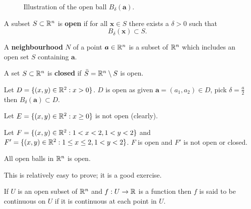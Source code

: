 \begin{figure}
    \centering
    \caption{Illustration of the open ball $B_\delta(\bm a)$.}
\end{figure}

\begin{definition}[Open]
    A subset $S \subset \mathbb{R}^n$ is \textbf{open} if for all $\bm x \in S$ there exists a $\delta > 0$ such that
    \[ B_\delta(\bm x) \subset S. \]
\end{definition}

\begin{definition}[Neighbourhood]
    A \textbf{neighbourhood} $N$ of a point $\bm a \in \mathbb{R}^n$ is a subset of $\mathbb{R}^n$ which includes an open set $S$ containing $\bm a$.
\end{definition}

\begin{definition}[Closed]
    A set $S \subset \mathbb{R}^n$ is \textbf{closed} if $\bar S = \mathbb{R}^n \setminus S$ is open.
\end{definition}

\begin{example}
    Let $D = \{ (x, y) \in \mathbb{R}^2 : x > 0 \}$. $D$ is open as given $\bm a = (a_1, a_2) \in D$, pick $\delta = \frac a2$ then $B_\delta(\bm a) \subset D$.
\end{example}

\begin{example}
    Let $E = \{ (x, y) \in \mathbb{R}^2 : x \geq 0 \}$ is not open (clearly).
\end{example}

\begin{example}
    Let $F = \{(x, y) \in \mathbb{R}^2: 1 < x < 2, 1 < y < 2 \}$
    and $F' = \{(x, y) \in \mathbb{R}^2: 1 \leq x \leq 2, 1 < y < 2 \}$.
    $F$ is open and $F'$ is not open or closed.
\end{example}

\begin{lemma}
    All open balls in $\mathbb{R}^n$ is open.
\end{lemma}

This is relatively easy to prove; it is a good exercise.

\begin{definition}[]
    If $U$ is an open subset of $\mathbb{R}^n$ and $f: U \to \mathbb{R}$ is a function then $f$ is said to be continuous on $U$ if it is continuous at each point in $U$.
\end{definition}
